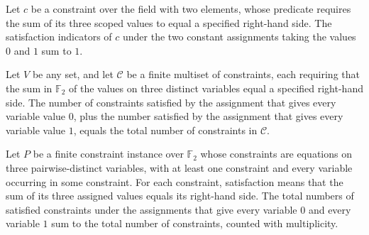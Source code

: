 \begin{theorem}
\label{FABL.satisfiedIndicator_zero_add_one_e3Lin}
\leanok
{}
Let $c$ be a constraint over the field with two elements, whose predicate requires the
sum of its three scoped values to equal a specified right-hand side. The satisfaction
indicators of $c$ under the two constant assignments taking the values $0$ and $1$ sum
to $1$.
\end{theorem}

\begin{theorem}
\label{FABL.sum_satisfiedIndicators_zero_add_one_e3Lin}
\leanok
{}
Let $V$ be any set, and let $\mathcal C$ be a finite multiset of constraints, each
requiring that the sum in $\mathbb F_2$ of the values on three distinct variables equal
a specified right-hand side. The number of constraints satisfied by the assignment that
gives every variable value $0$, plus the number satisfied by the assignment that gives
every variable value $1$, equals the total number of constraints in $\mathcal C$.
\end{theorem}

\begin{theorem}
\label{FABL.satisfiedCount_zero_add_one_e3Lin}
\leanok
{}
Let $P$ be a finite constraint instance over $\mathbb{F}_2$ whose constraints are
equations on three pairwise-distinct variables, with at least one constraint and every
variable occurring in some constraint. For each constraint, satisfaction means that the
sum of its three assigned values equals its right-hand side. The total numbers of
satisfied constraints under the assignments that give every variable $0$ and every
variable $1$ sum to the total number of constraints, counted with multiplicity.
\end{theorem}

